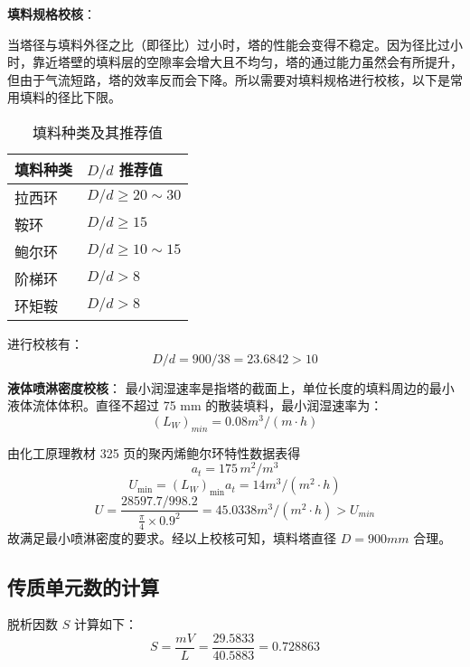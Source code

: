 \textbf{填料规格校核}：

当塔径与填料外径之比（即径比）过小时，塔的性能会变得不稳定。因为径比过小时，靠近塔壁的填料层的空隙率会增大且不均匀，塔的通过能力虽然会有所提升，但由于气流短路，塔的效率反而会下降。所以需要对填料规格进行校核，以下是常用填料的径比下限。

\begin{table}[h]
	\centering
	\caption{填料种类及其推荐值} %
	\begin{tabularx}{\textwidth}{|X|X|} %
		\hline 
		\textbf{填料种类} & \textbf{$D/d$ 推荐值} \\
		\hline 
		拉西环 & $D/d \geq 20 \sim 30$ \\
		\hline 
		鞍环 & $D/d \geq 15$ \\
		\hline 
		鲍尔环 & $D/d \geq 10 \sim 15$ \\
		\hline 
		阶梯环 & $D/d > 8$ \\ %
		\hline 
		环矩鞍 & $D/d > 8$ \\
		\hline
	\end{tabularx}
\end{table}
进行校核有：
\begin{equation}
	D/ d = 900/ 38 = 23.6842 > 10
\end{equation}

\textbf{液体喷淋密度校核}：
最小润湿速率是指塔的截面上，单位长度的填料周边的最小液体流体体积。直径不超过 75 mm 的散装填料，最小润湿速率为：
\begin{equation}
	(L_{W})_{min}=0.08m^{3}/(m \cdot h)
\end{equation}

由化工原理教材 325 页的聚丙烯鲍尔环特性数据表得
\begin{equation}
	a_{t}=175 \, m^2/m^3
\end{equation}
\begin{equation}
	U_{\min}=(L_{W})_{\min}a_{t}=14m^{3}/(m^{2}\cdot h)
\end{equation}
\begin{equation}
	U=\frac{28597.7/998.2}{\frac{\pi}{4}\times0.9 ^2}=45.0338 m^3/(m^2\cdot h)>U_{min}
\end{equation}
故满足最小喷淋密度的要求。经以上校核可知，填料塔直径 $D=900 mm$ 合理。

\subsection{传质单元数的计算}

脱析因数 \( S \) 计算如下：
\begin{equation}
	S = \frac{mV}{L} = \frac{29.5833}{40.5883} = 0.728863
\end{equation}


